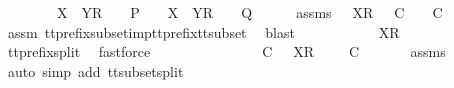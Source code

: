 \begin{isabellebody}
\ \ \ \ \ \ {\isasymrho}\ {\isacharat}\ {\isacharbrackleft}X\ {\isasymunion}\ Y{\isacharbrackright}\isactrlsub R\ {\isacharhash}\ {\isasymsigma}{\isacharprime}\ {\isasymin}\ P\ {\isasymand}\ {\isasymrho}\ {\isacharat}\ {\isacharbrackleft}X\ {\isasymunion}\ Y{\isacharbrackright}\isactrlsub R\ {\isacharhash}\ {\isasymsigma}{\isacharprime}\ {\isasymin}\ Q{\isachardoublequoteclose}\isanewline
\ \ \isamarkupfalse%
\ {\isasymtau}\ \ {\isasymtau}{\isacharunderscore}assms{\isacharcolon}\ {\isachardoublequoteopen}{\isasymrho}{\isacharprime}\ {\isacharat}\ {\isacharbrackleft}X{\isacharbrackright}\isactrlsub R\ {\isacharhash}\ {\isasymsigma}{\isacharprime}\ {\isasymle}\isactrlsub C\ {\isasymtau}\ {\isasymand}\ {\isasymtau}\ {\isasymsubseteq}\isactrlsub C\ {\isasymsigma}{\isachardoublequoteclose}\isanewline
\ \ \ \ \isamarkupfalse%
\ assm{}\ tt{\isacharunderscore}prefix{\isacharunderscore}subset{\isacharunderscore}imp{\isacharunderscore}tt{\isacharunderscore}prefix{\isacharunderscore}tt{\isacharunderscore}subset\ \isamarkupfalse%
\ blast\isanewline
\ \ \isamarkupfalse%
\ \isamarkupfalse%
\ {\isasymtau}{\isacharprime}\ \ {\isachardoublequoteopen}{\isasymtau}\ {\isacharequal}\ {\isasymrho}{\isacharprime}\ {\isacharat}\ {\isacharbrackleft}X{\isacharbrackright}\isactrlsub R\ {\isacharhash}\ {\isasymsigma}{\isacharprime}\ {\isacharat}\ {\isasymtau}{\isacharprime}{\isachardoublequoteclose}\isanewline
\ \ \ \ \isamarkupfalse%
\ tt{\isacharunderscore}prefix{\isacharunderscore}split\ \isamarkupfalse%
\ fastforce\isanewline
\ \ \isamarkupfalse%
\ \isamarkupfalse%
\ {\isachardoublequoteopen}{\isasymexists}\ {\isasymrho}{\isacharprime}{\isacharprime}\ {\isasymsigma}{\isacharprime}{\isacharprime}{\isachardot}\ {\isasymsigma}\ {\isacharequal}\ {\isasymrho}{\isacharprime}{\isacharprime}\ {\isacharat}\ {\isasymsigma}{\isacharprime}{\isacharprime}\ {\isasymand}\ {\isasymrho}{\isacharprime}\ {\isasymsubseteq}\isactrlsub C\ {\isasymrho}{\isacharprime}{\isacharprime}\ {\isasymand}\ {\isacharbrackleft}X{\isacharbrackright}\isactrlsub R\ {\isacharhash}\ {\isasymsigma}{\isacharprime}\ {\isacharat}\ {\isasymtau}{\isacharprime}\ {\isasymsubseteq}\isactrlsub C\ {\isasymsigma}{\isacharprime}{\isacharprime}{\isachardoublequoteclose}\isanewline
\ \ \ \ \isamarkupfalse%
\ {\isasymtau}{\isacharunderscore}assms\ \isamarkupfalse%
\ {\isacharparenleft}auto\ simp\ add{\isacharcolon}\ tt{\isacharunderscore}subset{\isacharunderscore}split{}{\isacharparenright}\isanewline

\end{isabellebody}
